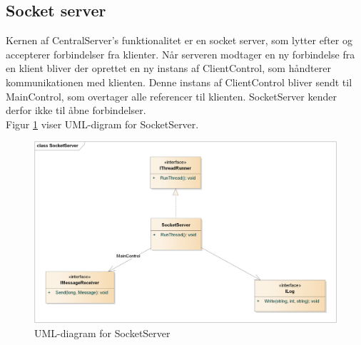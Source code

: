 \subsection{Socket server}
Kernen af CentralServer’s funktionalitet er en socket server, som lytter efter og accepterer forbindelser fra klienter. Når serveren modtager en ny forbindelse fra en klient bliver der oprettet en ny instans af ClientControl, som håndterer kommunikationen med klienten. Denne instans af ClientControl bliver sendt til MainControl, som overtager alle referencer til klienten. SocketServer kender derfor ikke til åbne forbindelser.\\

Figur \ref{fig:CSSocketServer} viser UML-digram for SocketServer.


\begin{figure}[H]
    \centering
    \includegraphics[width=1\textwidth]{Systemdesign/CentralServer/Images/SocketServer.png}
    \caption{UML-diagram for SocketServer}
    \label{fig:CSSocketServer}
\end{figure}